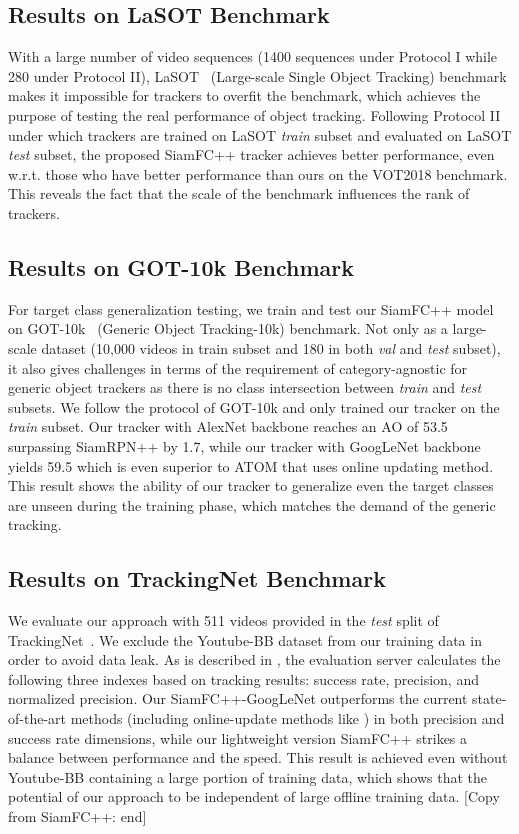\documentclass[journal]{IEEEtran}
\begin{document}
\subsection{Results on LaSOT Benchmark}
With a large number of video sequences (1400 sequences under Protocol I while 280 under Protocol II), LaSOT~\cite{fan2019lasot} (Large-scale Single Object Tracking) benchmark makes it impossible for trackers to overfit the benchmark, which achieves the purpose of testing the real performance of object tracking. Following Protocol II under which trackers are trained on LaSOT \textit{train} subset and evaluated on LaSOT \textit{test} subset, the proposed SiamFC++ tracker achieves better performance, even w.r.t. those who have better performance than ours on the VOT2018 benchmark. This reveals the fact that the scale of the benchmark influences the rank of trackers. 

\subsection{Results on GOT-10k Benchmark}
For target class generalization testing, we train and test our SiamFC++ model on GOT-10k~\cite{huang2018got} (Generic Object Tracking-10k) benchmark. Not only as a large-scale dataset (10,000 videos in train subset and 180 in both \textit{val} and \textit{test} subset), it also gives challenges in terms of the requirement of category-agnostic for generic object trackers as there is no class intersection between \textit{train} and \textit{test} subsets. We follow the protocol of GOT-10k and only trained our tracker on the \textit{train} subset. Our tracker with AlexNet backbone reaches an AO of 53.5 surpassing SiamRPN++ by 1.7, while our tracker with GoogLeNet backbone yields 59.5 which is even superior to ATOM that uses online updating method. This result shows the ability of our tracker to generalize even the target classes are unseen during the training phase, which matches the demand of the generic tracking.

\subsection{Results on TrackingNet Benchmark}
We evaluate our approach with 511 videos provided in the \textit{test} split of TrackingNet~\cite{muller2018trackingnet}. We exclude the Youtube-BB dataset from our training data in order to avoid data leak. As is described in \cite{muller2018trackingnet}, the evaluation server calculates the following three indexes based on tracking results: success rate, precision, and normalized precision. Our SiamFC++-GoogLeNet outperforms the current state-of-the-art methods (including online-update methods like \cite{danelljan2019atom}) in both precision and success rate dimensions, while our lightweight version SiamFC++ strikes a balance between performance and the speed. This result is achieved even without Youtube-BB containing a large portion of training data, which shows that the potential of our approach to be independent of large offline training data.
[Copy from SiamFC++: end]
\end{document}
